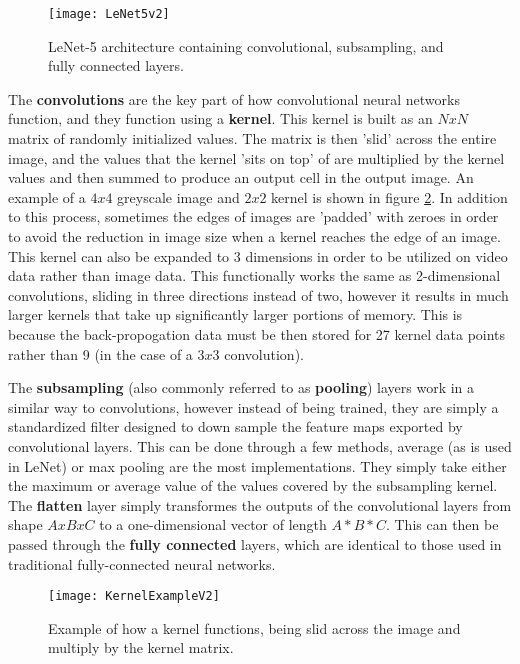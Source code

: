 \begin{figure}[ht]
	\texttt{[image: LeNet5v2]}
	\centering
	\caption{LeNet-5 architecture \cite{lenet5} containing convolutional, subsampling, and fully connected layers.}
	\label{fig:lenet5}
\end{figure}

The \textbf{convolutions} are the key part of how convolutional neural networks function, and they function using a \textbf{kernel}. This kernel is built as an $NxN$ matrix of randomly initialized values. The matrix is then 'slid' across the entire image, and the values that the kernel 'sits on top' of are multiplied by the kernel values and then summed to produce an output cell in the output image. An example of a $4x4$ greyscale image and $2x2$ kernel is shown in figure \ref{fig:kernel-example}. In addition to this process, sometimes the edges of images are 'padded' with zeroes in order to avoid the reduction in image size when a kernel reaches the edge of an image. This kernel can also be expanded to 3 dimensions in order to be utilized on video data rather than image data. This functionally works the same as 2-dimensional convolutions, sliding in three directions instead of two, however it results in much larger kernels that take up significantly larger portions of memory. This is because the back-propogation data must be then stored for 27 kernel data points rather than 9 (in the case of a $3x3$ convolution).

The \textbf{subsampling} (also commonly referred to as \textbf{pooling}) layers work in a similar way to convolutions, however instead of being trained, they are simply a standardized filter designed to down sample the feature maps exported by convolutional layers. This can be done through a few methods, average (as is used in LeNet) or max pooling are the most implementations. They simply take either the maximum or average value of the values covered by the subsampling kernel. The \textbf{flatten} layer simply transformes the outputs of the convolutional layers from shape $AxBxC$ to a one-dimensional vector of length $A*B*C$. This can then be passed through the \textbf{fully connected} layers, which are identical to those used in traditional fully-connected neural networks.

\begin{figure}[p]
	\texttt{[image: KernelExampleV2]}
	\centering
	\caption{Example of how a kernel functions, being slid across the image and multiply by the kernel matrix.}
	\label{fig:kernel-example}
\end{figure}

